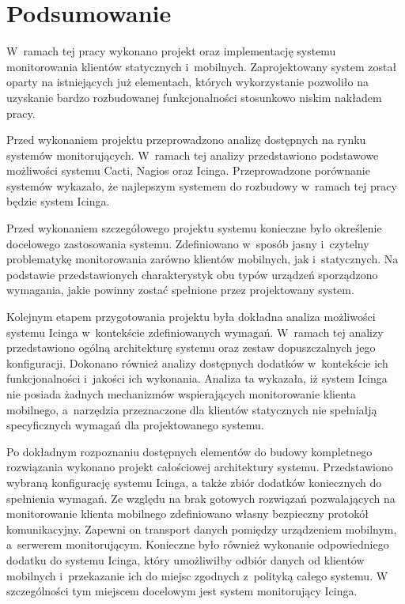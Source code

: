 \chapter{Podsumowanie}
\label{chap:Podsumowanie}

W~ramach tej pracy wykonano projekt oraz implementację systemu
monitorowania klientów statycznych i~mobilnych. Zaprojektowany system
został oparty na istniejących już elementach, których wykorzystanie
pozwoliło na uzyskanie bardzo rozbudowanej funkcjonalności stosunkowo
niskim nakładem pracy.

Przed wykonaniem projektu przeprowadzono analizę dostępnych na rynku
systemów monitorujących. W~ramach tej analizy przedstawiono podstawowe
możliwości systemu Cacti, Nagios oraz Icinga. Przeprowadzone
porównanie systemów wykazało, że najlepszym systemem do rozbudowy
w~ramach tej pracy będzie system Icinga.

Przed wykonaniem szczegółowego projektu systemu konieczne było
określenie docelowego zastosowania systemu. Zdefiniowano w~sposób
jasny i~czytelny problematykę monitorowania zarówno klientów
mobilnych, jak i~statycznych. Na podstawie przedstawionych
charakterystyk obu typów urządzeń sporządzono wymagania, jakie powinny
zostać spełnione przez projektowany system.

Kolejnym etapem przygotowania projektu była dokładna analiza
możliwości systemu Icinga w~kontekście zdefiniowanych
wymagań. W~ramach tej analizy przedstawiono ogólną architekturę
systemu oraz zestaw dopuszczalnych jego konfiguracji. Dokonano również
analizy dostępnych dodatków w~kontekście ich funkcjonalności i~jakości
ich wykonania. Analiza ta wykazała, iż system Icinga nie posiada
żadnych mechanizmów wspierających monitorowanie klienta mobilnego,
a~narzędzia przeznaczone dla klientów statycznych nie spełniałją
specyficznych wymagań dla projektowanego systemu.

Po dokładnym rozpoznaniu dostępnych elementów do budowy kompletnego
rozwiązania wykonano projekt całościowej architektury
systemu. Przedstawiono wybraną konfigurację systemu Icinga, a także
zbiór dodatków koniecznych do spełnienia wymagań. Ze względu na brak
gotowych rozwiązań pozwalających na monitorowanie klienta mobilnego
zdefiniowano własny bezpieczny protokół komunikacyjny. Zapewni on
transport danych pomiędzy urządzeniem mobilnym, a~serwerem
monitorującym. Konieczne było również wykonanie odpowiedniego dodatku
do systemu Icinga, który umożliwiłby odbiór danych od klientów
mobilnych i~przekazanie ich do miejsc zgodnych z~polityką całego
systemu. W szczególności tym miejscem docelowym jest system
monitorujący Icinga.

